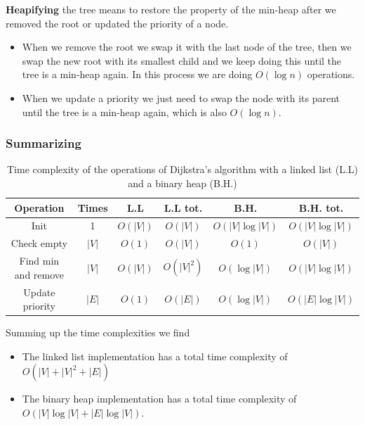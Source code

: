 \documentclass[12pt]{extarticle}
\begin{document}
\textbf{Heapifying} the tree means to restore the property of the min-heap after we removed the root or updated the priority of a node.

\begin{itemize}
    \item
          When we remove the root we swap it with the last node of the tree, then we swap the new root with its smallest child and we keep doing this until the tree is a min-heap again.
          In this process we are doing $O(\log n)$ operations.
    \item
          When we update a priority we just need to swap the node with its parent until the tree is a min-heap again, which is also $O(\log n)$.
\end{itemize}

\subsubsection{Summarizing}

\begin{table}[H]
    \centering
    \begin{tabular}{ |c|c|c|c|c|c| }
        \hline
        \textbf{Operation}  & \textbf{Times} & \textbf{L.L} & \textbf{L.L tot.} & \textbf{B.H.}     & \textbf{B.H. tot.} \\
        \hline
        Init                & 1              & $O(|V|)$     & $O(|V|)$          & $O(|V| \log |V|)$ & $O(|V| \log |V|)$  \\
        Check empty         & $|V|$          & $O(1)$       & $O(|V|)$          & $O(1)$            & $O(|V|)$           \\
        Find min and remove & $|V|$          & $O(|V|)$     & $O(|V|^2)$        & $O(\log |V|)$     & $O(|V| \log |V|)$  \\
        Update priority     & $|E|$          & $O(1)$       & $O(|E|)$          & $O(\log |V|)$     & $O(|E| \log |V|)$  \\
        \hline
    \end{tabular}
    \caption{Time complexity of the operations of Dijkstra's algorithm with a linked list (L.L) and a binary heap (B.H.)}
    \label{tab:dijsktra_timecomplexity}
\end{table}

Summing up the time complexities we find

\begin{itemize}
    \item The linked list implementation has a total time complexity of $O(|V| + |V|^2 + |E|)$
    \item The binary heap implementation has a total time complexity of $O(|V| \log |V| + |E| \log |V|)$.
\end{itemize}
\end{document}
